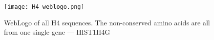 \begin{figure}
  \centering
  \texttt{[image: H4\_weblogo.png]}
  \caption{WebLogo of all H4 sequences. The non-conserved amino acids are all from one single gene --- HIST1H4G}
  \label{fig:h4-weblogo}
\end{figure}


